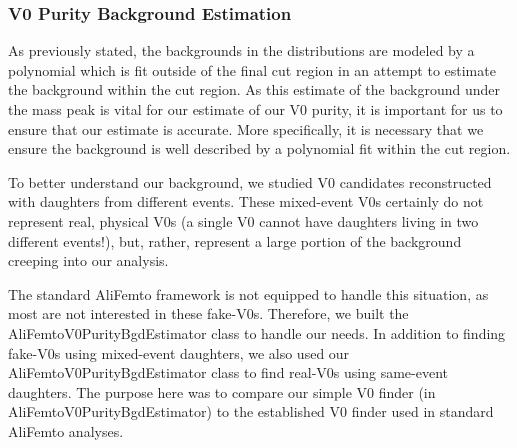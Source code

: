 \documentclass[../AnalysisNoteJBuxton.tex]{subfiles}
\begin{document}
\subsubsection{V0 Purity Background Estimation}
\label{V0PurBgdEst}

As previously stated, the backgrounds in the \minv distributions are modeled by a polynomial which is fit outside of the final cut region in an attempt to estimate the background within the cut region.  As this estimate of the background under the mass peak is vital for our estimate of our V0 purity, it is important for us to ensure that our estimate is accurate.  More specifically, it is necessary that we ensure the background is well described by a polynomial fit within the cut region.

To better understand our background, we studied V0 candidates reconstructed with daughters from different events.  These mixed-event V0s certainly do not represent real, physical V0s (a single V0 cannot have daughters living in two different events!), but, rather, represent a large portion of the background creeping into our analysis.

The standard AliFemto framework is not equipped to handle this situation, as most are not interested in these fake-V0s.  Therefore, we built the AliFemtoV0PurityBgdEstimator class to handle our needs.  In addition to finding fake-V0s using mixed-event daughters, we also used our AliFemtoV0PurityBgdEstimator class to find real-V0s using same-event daughters.  The purpose here was to compare our simple V0 finder (in AliFemtoV0PurityBgdEstimator) to the established V0 finder used in standard AliFemto analyses.
\end{document}
